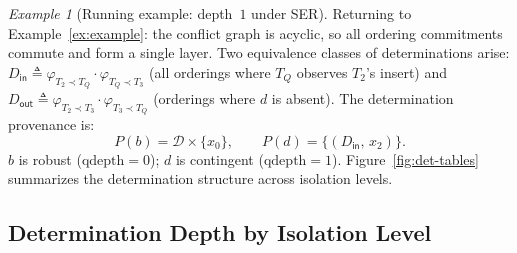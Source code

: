 \documentclass[acmsmall,review,anonymous]{acmart}
\theoremstyle{remark}
\newtheorem{example}{Example}
\numberwithin{definition}{section}
\numberwithin{theorem}{section}
\numberwithin{lemma}{section}
\numberwithin{corollary}{section}
\numberwithin{remark}{section}
\numberwithin{example}{section}
\numberwithin{observation}{section}
\numberwithin{assumption}{section}
\begin{document}
\begin{example}[Running example: depth~$1$ under SER]
  \label{ex:running-revisited}
  Returning to Example~\ref{ex:example}: the conflict graph is
  acyclic, so all ordering commitments commute and form a single layer.
  Two equivalence classes of determinations arise:
  $D_{\mathsf{in}} \triangleq
    \varphi_{T_2 \prec T_Q} \cdot \varphi_{T_Q \prec T_3}$
  (all orderings where $T_Q$ observes $T_2$'s insert)
  and
  $D_{\mathsf{out}} \triangleq
    \varphi_{T_2 \prec T_3} \cdot \varphi_{T_3 \prec T_Q}$
  (orderings where $d$ is absent).
  The determination provenance is:
  \[
    P(b) = \mathcal{D} \times \{x_0\}, \qquad
    P(d) = \{(D_{\mathsf{in}},\, x_2)\}.
  \]
  $b$ is robust ($\mathrm{qdepth} = 0$); $d$ is contingent
  ($\mathrm{qdepth} = 1$).
  Figure~\ref{fig:det-tables} summarizes the determination structure
  across isolation levels.
\end{example}

\subsection{Determination Depth by Isolation Level}
\end{document}
